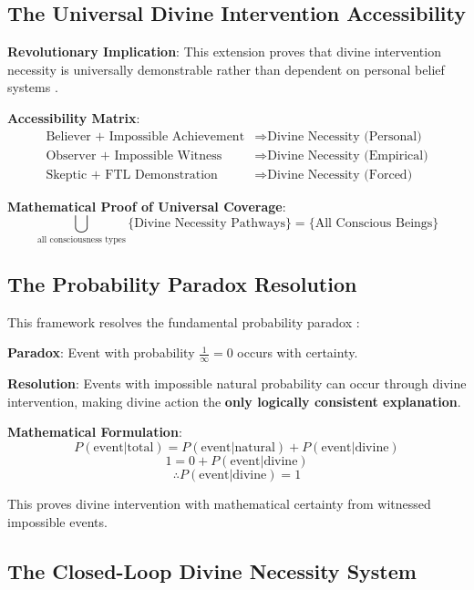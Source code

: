 \documentclass[12pt,a4paper]{article}
\begin{document}
\subsection{The Universal Divine Intervention Accessibility}

\textbf{Revolutionary Implication}: This extension proves that divine intervention necessity is universally demonstrable rather than dependent on personal belief systems \citep{sachikonye2024universal}.

\textbf{Accessibility Matrix}:
\begin{align}
\text{Believer + Impossible Achievement} &\Rightarrow \text{Divine Necessity (Personal)}\\
\text{Observer + Impossible Witness} &\Rightarrow \text{Divine Necessity (Empirical)}\\
\text{Skeptic + FTL Demonstration} &\Rightarrow \text{Divine Necessity (Forced)}
\end{align}

\textbf{Mathematical Proof of Universal Coverage}:
$$\bigcup_{\text{all consciousness types}} \{\text{Divine Necessity Pathways}\} = \{\text{All Conscious Beings}\}$$

\subsection{The Probability Paradox Resolution}

This framework resolves the fundamental probability paradox \citep{sachikonye2024probability}:

\textbf{Paradox}: Event with probability $\frac{1}{\infty} = 0$ occurs with certainty.

\textbf{Resolution}: Events with impossible natural probability can occur through divine intervention, making divine action the \textbf{only logically consistent explanation}.

\textbf{Mathematical Formulation}:
$$P(\text{event}|\text{total}) = P(\text{event}|\text{natural}) + P(\text{event}|\text{divine})$$
$$1 = 0 + P(\text{event}|\text{divine})$$
$$\therefore P(\text{event}|\text{divine}) = 1$$

This proves divine intervention with mathematical certainty from witnessed impossible events.

\subsection{The Closed-Loop Divine Necessity System}
\end{document}
